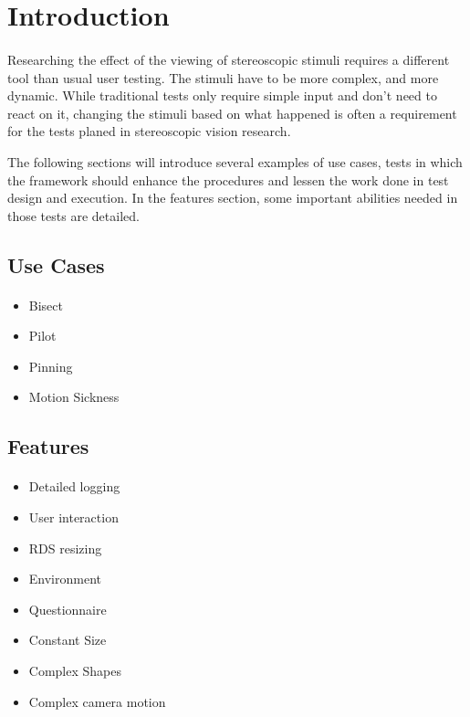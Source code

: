 \section{Introduction\label{Introduction}}
\paragraph{}
Researching the effect of the viewing of stereoscopic stimuli requires a different tool than usual user testing. The stimuli have to be more complex, and more dynamic. While traditional tests only require simple input and don't need to react on it, changing the stimuli based on what happened is often a requirement for the tests planed in stereoscopic vision research.

The following sections will introduce several examples of use cases, tests in which the framework should enhance the procedures and lessen the work done in test design and execution.
In the features section, some important abilities needed in those tests are detailed.

\subsection{Use Cases}
\paragraph{}

\begin{itemize}
\item Bisect
\item Pilot
\item Pinning
\item Motion Sickness
\end{itemize}

\subsection{Features}
\paragraph{}

\begin{itemize}
\item Detailed logging
\item User interaction
\item RDS resizing
\item Environment
\item Questionnaire
\item Constant Size
\item Complex Shapes
\item Complex camera motion
\end{itemize}
